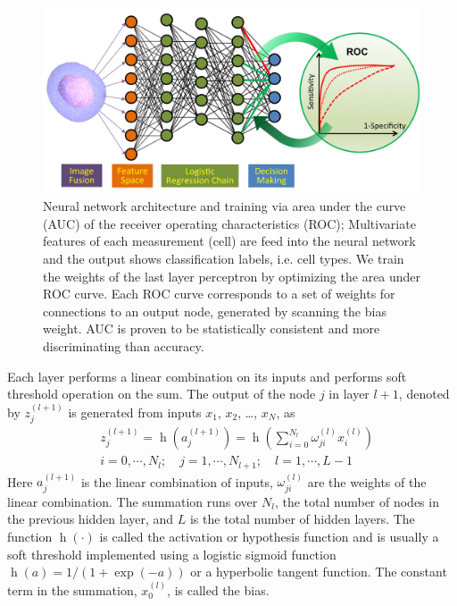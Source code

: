 \documentclass[aps,pra,reprint,superscriptaddress]{revtex4-1}
\DeclareMathOperator{\h}{h} %
\begin{document}
\begin{figure}
\includegraphics[scale=0.2]{FigureNeuralNet.jpg}
\caption{\label{fig:NeuralNet} Neural network architecture and training via area under the curve (AUC) of the receiver operating characteristics (ROC); Multivariate features of each measurement (cell) are feed into the neural network and the output shows classification labels, i.e. cell types. We train the weights of the last layer perceptron by optimizing the area under ROC curve. Each ROC curve corresponds to a set of weights for connections to an output node, generated by scanning the bias weight. AUC is proven to be statistically consistent and more discriminating than accuracy.}
\end{figure}

Each layer performs a linear combination on its inputs and performs soft threshold operation on the sum. The output of the node $j$ in layer $l+1$, denoted by $z_j^{(l+1)}$ is generated from inputs $x_1$, $x_2$, \ldots, $x_N$, as
\begin{equation}
\begin{split}
& z_j^{(l+1)} = \h(a_j^{(l+1)}) = \h(\sum_{i=0}^{N_l} \omega_{ji}^{(l)} x_i^{(l)})\\
& i =0,\cdots,N_l;\quad j=1,\cdots,N_{l+1};\quad l=1,\cdots,L-1
\end{split}
\end{equation}
Here $a_j^{(l+1)}$ is the linear combination of inputs, $\omega_{ji}^{(l)}$ are the weights of the linear combination. The summation runs over $N_l$, the total number of nodes in the previous hidden layer, and $L$ is the total number of hidden layers. The function $\h(\cdot)$ is called the activation or hypothesis function and is usually a soft threshold implemented using a logistic sigmoid function $\h(a)=1/(1+\exp(-a))$ or a hyperbolic tangent function. The constant term in the summation, $x_0^{(l)}$, is called the bias.
\end{document}
